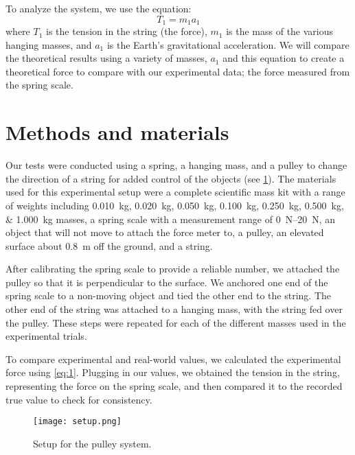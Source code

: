 \documentclass[reprint,amsmath,amssymb,aps]{revtex4-2}
\begin{document}
To analyze the system, we use the equation:
\begin{equation}
T_1 = m_1 a_1
\label{eq:1}
\end{equation}
where $T_1$ is the tension in the string (the force), $m_1$ is the mass of the various hanging masses, and $a_1$ is the Earth's gravitational acceleration. We will compare the theoretical results using a variety of masses, $a_1$ and this equation to create a theoretical force to compare with our experimental data; the force measured from the spring scale.




    
\section{Methods and materials}
Our tests were conducted using a spring, a hanging mass, and a pulley to change the direction of a string for added control of the objects (see \cref{fig:setup}). The materials used for this experimental setup were a complete scientific mass kit with a range of weights including \qtylist{0.010;0.020;0.050;0.100;0.250;0.500;1.000}{\kilo\gram} masses, a spring scale with a measurement range of \qtyrange{0}{20}{\newton}, an object that will not move to attach the force meter to, a pulley, an elevated surface about \qty{0.8}{\meter} off the ground, and a string.
        
After calibrating the spring scale to provide a reliable number, we attached the pulley so that it is perpendicular to the surface. We anchored one end of the spring scale to a non-moving object and tied the other end to the string. The other end of the string was attached to a hanging mass, with the string fed over the pulley. These steps were repeated for each of the different masses used in the experimental trials.
        
To compare experimental and real-world values, we calculated the experimental force using \cref{eq:1}. Plugging in our values, we obtained the tension in the string, representing the force on the spring scale, and then compared it to the recorded true value to check for consistency. 
\begin{figure}
\begin{center}
\texttt{[image: setup.png]}
\end{center}
\caption{\label{fig:setup} Setup for the pulley system.}
\end{figure}
        
\end{document}
